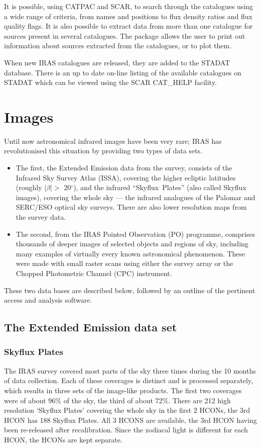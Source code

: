 It is possible, using CATPAC and SCAR, to search through the catalogues using 
a wide range of criteria, from names and positions to flux density ratios and 
flux quality flags.
It is also possible to extract data from more than one catalogue for sources 
present in several catalogues.
The package allows the user to print out information about sources extracted
from the catalogues, or to plot them.

When new IRAS catalogues are released, they are added to the STADAT 
database.
There is an up to date on-line listing of the available catalogues on STADAT
which can be viewed using the SCAR CAT\_HELP facility.

\section{Images}
\label{m:images}
Until now astronomical infrared images have been very rare; IRAS has
revolutionised this situation by providing two types of data sets.
\begin{itemize}
\item The first, the Extended Emission data from the survey, consists of
the Infrared Sky Survey Atlas (ISSA), covering the higher ecliptic latitudes 
(roughly $| \beta | >$ 20$^{\circ}$), and the infrared ``Skyflux~Plates'' 
(also called Skyflux images), covering the whole sky --- the infrared analogues 
of the Palomar and SERC/ESO optical sky surveys. 
There are also lower resolution maps from the survey data.
\item The second, from the IRAS Pointed Observation (PO) programme,
comprises thousands of deeper images of selected objects and regions of sky,
including many examples of virtually every known astronomical phenomenon.
These were made with small raster scans using either the survey array or the
Chopped Photometric Channel (CPC) instrument.
\end{itemize}
These two data bases are described below, followed by an outline of the
pertinent access and analysis software.

\subsection{The Extended Emission data set}

\subsubsection{Skyflux Plates}
The IRAS survey covered most parts of the sky three times during the 10 months
of data collection. Each of these coverages is distinct and is processed
separately, which results in three sets of the image-like products. The first
two coverages were of about 96\% of the sky, the third of about 72\%. 
There are 212 high resolution `Skyflux Plates' covering the whole sky in the
first 2 HCONs, the 3rd HCON has 188 Skyflux Plates. All 3 HCONS are available, 
the 3rd HCON having been re-released after recalibration.
Since the zodiacal light is different for each HCON, the HCONs are kept 
separate.


